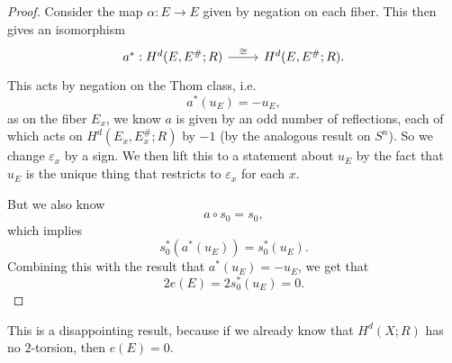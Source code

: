\documentclass[a4paper]{article}
\theoremstyle{definition}
\begin{document}
\begin{proof}
  Consider the map $\alpha: E \to E$ given by negation on each fiber. This then gives an isomorphism
  \[
    \begin{tikzcd}
      a^*: H^d(E, E^\#; R) \ar[r, "\cong"] & H^d(E, E^\#; R).
    \end{tikzcd}
  \]
  This acts by negation on the Thom class, i.e.
  \[
    a^*(u_E) = - u_E,
  \]
  as on the fiber $E_x$, we know $a$ is given by an odd number of reflections, each of which acts on $H^d(E_x, E_x^\#; R)$ by $-1$ (by the analogous result on $S^n$). So we change $\varepsilon_x$ by a sign. We then lift this to a statement about $u_E$ by the fact that $u_E$ is the unique thing that restricts to $\varepsilon_x$ for each $x$.

  But we also know
  \[
    a \circ s_0 = s_0,
  \]
  which implies
  \[
    s_0^*(a^*(u_E)) = s_0^*(u_E).
  \]
  Combining this with the result that $a^*(u_E) = -u_E$, we get that
  \[
    2 e(E) = 2 s_0^*(u_E) = 0.
  \]
\end{proof}
This is a disappointing result, because if we already know that $H^d(X; R)$ has no $2$-torsion, then $e(E) = 0$.
\end{document}
